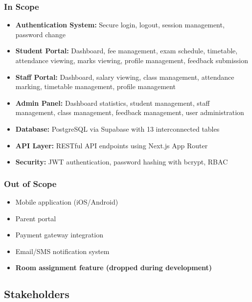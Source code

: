 \documentclass[12pt,a4paper]{article}
\begin{document}
\subsubsection{In Scope}
\begin{itemize}[noitemsep]
    \item \textbf{Authentication System:} Secure login, logout, session management, password change
    \item \textbf{Student Portal:} Dashboard, fee management, exam schedule, timetable, attendance viewing, marks viewing, profile management, feedback submission
    \item \textbf{Staff Portal:} Dashboard, salary viewing, class management, attendance marking, timetable management, profile management
    \item \textbf{Admin Panel:} Dashboard statistics, student management, staff management, class management, feedback management, user administration
    \item \textbf{Database:} PostgreSQL via Supabase with 13 interconnected tables
    \item \textbf{API Layer:} RESTful API endpoints using Next.js App Router
    \item \textbf{Security:} JWT authentication, password hashing with bcrypt, RBAC
\end{itemize}

\subsubsection{Out of Scope}
\begin{itemize}[noitemsep]
    \item Mobile application (iOS/Android)
    \item Parent portal
    \item Payment gateway integration
    \item Email/SMS notification system
    \item \textbf{Room assignment feature (dropped during development)}
\end{itemize}

\subsection{Stakeholders}
\end{document}
